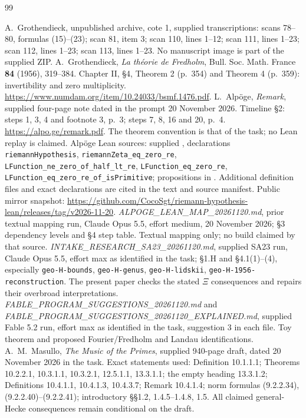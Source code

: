 \documentclass[11pt,a4paper]{article}
\begin{document}
\begin{thebibliography}{99}\raggedright
{} A.~Grothendieck, unpublished archive, cote 1, supplied transcriptions: scans 78--80, formulas (15)--(23); scan 81, item 3; scan 110, lines 1--12; scan 111, lines 1--23; scan 112, lines 1--23; scan 113, lines 1--23. No manuscript image is part of the supplied ZIP.
 A.~Grothendieck, \emph{La th\'eorie de Fredholm}, Bull. Soc. Math. France \textbf{84} (1956), 319--384. Chapter II, \S4, Theorem 2 (p.~354) and Theorem 4 (p.~359): invertibility and zero multiplicity. \url{https://www.numdam.org/item/10.24033/bsmf.1476.pdf}.
 L.~Alp\"oge, \emph{Remark}, supplied four-page note dated in the prompt 20 November 2026. Timeline \S2: steps 1, 3, 4 and footnote 3, p.~3; steps 7, 8, 16 and 20, p.~4. \url{https://alpo.ge/remark.pdf}. The theorem convention is that of the task; no Lean replay is claimed.
 Alp\"oge Lean sources: supplied , declarations \texttt{riemannHypothesis}, \texttt{riemannZeta\_eq\_zero\_re}, \texttt{LFunction\_ne\_zero\_of\_half\_lt\_re}, \texttt{LFunction\_eq\_zero\_re}, \texttt{LFunction\_eq\_zero\_re\_of\_isPrimitive}; propositions in . Additional definition files and exact declarations are cited in the text and source manifest. Public mirror snapshot: \url{https://github.com/CocoSgt/riemann-hypothesis-lean/releases/tag/v2026-11-20}.
 \emph{ALPOGE\_LEAN\_MAP\_20261120.md}, prior textual mapping run, Claude Opus 5.5, effort medium, 20 November 2026; \S3 dependency levels and \S4 step table. Textual mapping only; no build claimed by that source.
 \emph{INTAKE\_RESEARCH\_SA23\_20261120.md}, supplied SA23 run, Claude Opus 5.5, effort max as identified in the task; \S1.H and \S4.1(1)--(4), especially \texttt{geo-H-bounds}, \texttt{geo-H-genus}, \texttt{geo-H-lidskii}, \texttt{geo-H-1956-reconstruction}. The present paper checks the stated $\Xi$ consequences and repairs their overbroad interpretations.
 \emph{FABLE\_PROGRAM\_SUGGESTIONS\_20261120.md} and \emph{FABLE\_PROGRAM\_SUGGESTIONS\_20261120\_EXPLAINED.md}, supplied Fable 5.2 run, effort max as identified in the task, suggestion 3 in each file. Toy theorem and proposed Fourier/Fredholm and Landau identifications.
 A.~M.~Masullo, \emph{The Music of the Primes}, supplied 940-page draft, dated 20 November 2026 in the task. Exact statements used: Definition 10.1.1.1; Theorems 10.2.2.1, 10.3.1.1, 10.3.2.1, 12.5.1.1, 13.3.1.1; the empty heading 13.3.1.2; Definitions 10.4.1.1, 10.4.1.3, 10.4.3.7; Remark 10.4.1.4; norm formulas (9.2.2.34), (9.2.2.40)--(9.2.2.41); introductory \S\S1.2, 1.4.5--1.4.8, 1.5. All claimed general-Hecke consequences remain conditional on the draft.

\end{thebibliography}
\end{document}

